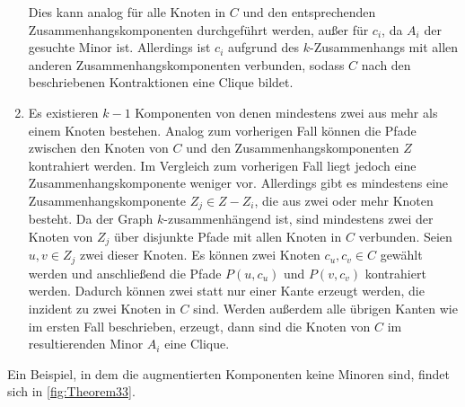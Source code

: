 \begin{beweis}
\begin{enumerate}
          Dies kann analog für alle Knoten in $C$ und den entsprechenden Zusammenhangskomponenten durchgeführt werden, außer für $c_i$, da $A_i$ der gesuchte Minor ist.
          Allerdings ist $c_i$ aufgrund des $k$-Zusammenhangs mit allen anderen Zusammenhangskomponenten verbunden, sodass $C$ nach den beschriebenen Kontraktionen eine Clique bildet.
    \item Es existieren $k-1$ Komponenten von denen mindestens zwei aus mehr als einem Knoten bestehen.
          Analog zum vorherigen Fall können die Pfade zwischen den Knoten von $C$ und den Zusammenhangskomponenten $Z$ kontrahiert werden.
          Im Vergleich zum vorherigen Fall liegt jedoch eine Zusammenhangskomponente weniger vor.
          Allerdings gibt es mindestens eine Zusammenhangskomponente $Z_j \in Z - Z_i$, die aus zwei oder mehr Knoten besteht.
          Da der Graph $k$-zusammenhängend ist, sind mindestens zwei der Knoten von $Z_j$ über disjunkte Pfade mit allen Knoten in $C$ verbunden.
          Seien $u, v \in Z_j$ zwei dieser Knoten.
          Es können zwei Knoten $c_u, c_v \in C$ gewählt werden und anschließend die Pfade $P(u, c_u)$ und $P(v, c_v)$ kontrahiert werden.
          Dadurch können zwei statt nur einer Kante erzeugt werden, die inzident zu zwei Knoten in $C$ sind.
          Werden außerdem alle übrigen Kanten wie im ersten Fall beschrieben, erzeugt, dann sind die Knoten von $C$ im resultierenden Minor $A_i$ eine Clique.
  \end{enumerate}
  Ein Beispiel, in dem die augmentierten Komponenten keine Minoren sind, findet sich in \Abb \ref{fig:Theorem33}.
\end{beweis}
